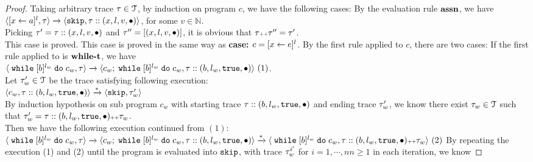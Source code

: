       \begin{proof}
      Taking arbitrary trace $\mathtt{\tau} \in \mathcal{T}$, by induction on program $c$, we have the following cases:
      By the evaluation rule $\rname{assn}$, we have
      $
      {
      \langle [\mathrel{ {x} \leftarrow a }]^{l},  \mathtt{\tau}  \rangle 
      \xrightarrow{} 
      \langle \mathtt{skip}, \mathtt{\tau} :: ({x}, l, v, \bullet) \rangle
      }$, for some $v \in \mathbb{N}$.
      \\
      Picking $\mathtt{\tau}' = \mathtt{\tau} ::({x}, l, v, \bullet)$ and $\mathtt{\tau}'' =  [({x}, l, v, \bullet) ]$,
      it is obvious that $\mathtt{\tau} {\scriptscriptstyle ++} \mathtt{\tau}'' = \mathtt{\tau}'$.
      \\
      This case is proved.
      This case is proved in the same way as \textbf{case: $c = [\mathrel{ x \leftarrow e }]^l$}.
      By the first rule applied to $c$, there are two cases:
      If the first rule applied to is $\rname{while-t}$, we have
      \\
      $\langle {\;\ensuremath{\mathtt{while}}\;[b]^{l_w} \;\ensuremath{\mathtt{do}}\;c_w, \ensuremath{\mathtt{\tau}}} \rangle
        \xrightarrow{} 
        \langle {
        c_w; \;\ensuremath{\mathtt{while}}\;[b]^{l_w} \;\ensuremath{\mathtt{do}}\;c_w,
        \ensuremath{\mathtt{\tau}}:: (b, l_w, \ensuremath{\mathtt{true}}, \bullet)} \rangle~ (1)
      $.
      \\
      Let $\mathtt{\tau}_w' \in \mathcal{T}$ be the trace satisfying following execution:
      \\
      $
      \langle {
      c_w,
      \ensuremath{\mathtt{\tau}}:: (b, l_w, \ensuremath{\mathtt{true}}, \bullet)} \rangle
      \xrightarrow{*} 
      \langle {
      \ensuremath{\mathtt{skip}}, \ensuremath{\mathtt{\tau}}_w'} \rangle
    $
    \\
    By induction hypothesis on sub program $c_w$ with starting trace 
    $\mathtt{\tau} :: (b, l_w, \mathtt{true}, \bullet)$ and ending trace $\mathtt{\tau}_w'$, 
    we know there exist
    $\mathtt{\tau}_w \in \mathcal{T}$ such that $\mathtt{\tau}_w' = \mathtt{\tau} :: (b, l_w, \mathtt{true}, \bullet) {\scriptscriptstyle ++} \mathtt{\tau}_w$.
    \\
    Then we have the following execution continued from $(1)$:
    \\
    $
    \langle {\;\ensuremath{\mathtt{while}}\;[b]^{l_w} \;\ensuremath{\mathtt{do}}\;c_w, \ensuremath{\mathtt{\tau}}} \rangle
        \xrightarrow{} 
        \langle {
        c_w; \;\ensuremath{\mathtt{while}}\;[b]^{l_w} \;\ensuremath{\mathtt{do}}\;c_w,
        \ensuremath{\mathtt{\tau}}:: (b, l_w, \ensuremath{\mathtt{true}}, \bullet)} \rangle
        \xrightarrow{*} 
        \langle \;\mathtt{while}\; [b]^{l_w} \;\mathtt{do}\; c_w, \mathtt{\tau} :: (b, l_w, \mathtt{true}, \bullet) {\scriptscriptstyle ++} \mathtt{\tau}_w \rangle
        ~(2)
    $
    By repeating the execution (1) and (2) until the program is evaluated into $\mathtt{skip}$,
    with trace $\mathtt{\tau}_w^{i'} $ for $i = 1, \cdots, n n \geq 1$ in each iteration, we know 

\end{proof}
